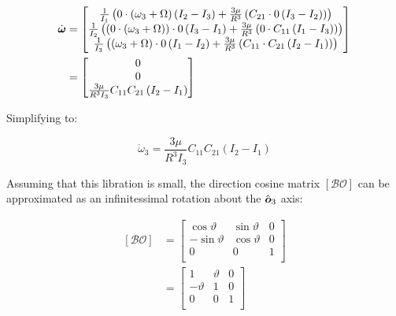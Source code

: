 \begin{align*}
    \dot{\boldsymbol{\omega}} &= \begin{bmatrix}
        \frac{1}{I_1} \left(0 \cdot \left(\omega_3 + \Omega\right) \left(I_2 - I_3\right) + \frac{3 \mu}{R^3} \left(C_{21} \cdot 0 \left(I_3 - I_2\right)\right)\right) \\
        \frac{1}{I_2} \left(\left(0 \cdot \left(\omega_3 + \Omega\right)\right) \cdot 0 \left(I_3 - I_1\right) + \frac{3 \mu}{R^3} \left(0 \cdot C_{11} \left(I_1 - I_3\right)\right)\right) \\
        \frac{1}{I_3} \left(\left(\omega_3 + \Omega\right) \cdot 0 \left(I_1 - I_2\right) + \frac{3 \mu}{R^3} \left(C_{11} \cdot C_{21} \left(I_2 - I_1\right)\right)\right) \\
    \end{bmatrix} \\
    &= \begin{bmatrix}
        0 \\ 0 \\ \frac{3 \mu}{R^3 I_3} C_{11} C_{21} \left(I_2 - I_1\right) \\
    \end{bmatrix}
\end{align*}

Simplifying to:

\begin{equation}
    \dot{\omega}_3 = \frac{3 \mu}{R^3 I_3} C_{11} C_{21} \left(I_2 - I_1\right)
\end{equation}

Assuming that this libration is small, the direction cosine matrix $\left[\mathcal{BO}\right]$ can be approximated as an infinitessimal rotation about the $\hat{\boldsymbol{o}}_3$ axis:

\begin{align*}
    \left[\mathcal{BO}\right] &= \begin{bmatrix}
        \cos\vartheta & \sin\vartheta & 0 \\
        -\sin\vartheta & \cos\vartheta & 0 \\
        0 & 0 & 1 \\
    \end{bmatrix} \\
    &= \begin{bmatrix}
        1 & \vartheta & 0 \\
        -\vartheta & 1 & 0 \\
        0 & 0 & 1 \\
    \end{bmatrix} \\
\end{align*}

